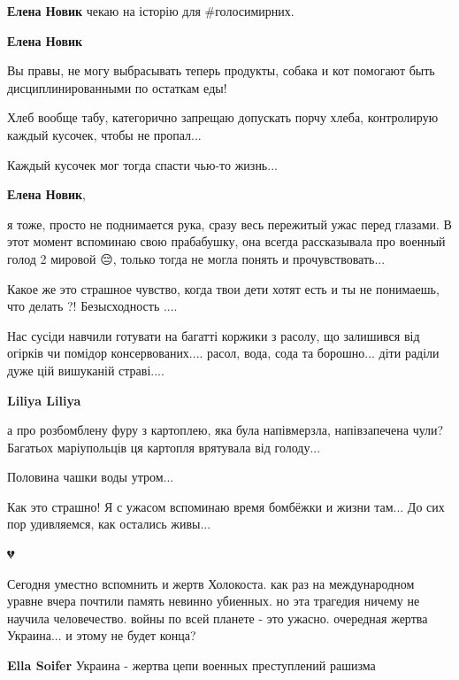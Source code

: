 \begin{itemize} %
\textbf{Елена Новик} чекаю на історію для \#голосимирних.

\textbf{Елена Новик} 

Вы правы, не могу выбрасывать теперь продукты, собака и кот помогают быть
дисциплинированными по остаткам еды!

Хлеб вообще табу, категорично запрещаю допускать порчу хлеба, контролирую каждый
кусочек, чтобы не пропал...

Каждый кусочек мог тогда спасти чью-то жизнь...

\textbf{Елена Новик}, 

я тоже, просто не поднимается рука, сразу весь пережитый ужас перед глазами. В
этот момент вспоминаю свою прабабушку, она всегда рассказывала про военный
голод 2 мировой 😔, только тогда не могла понять и прочувствовать...

Какое же это страшное чувство, когда твои дети хотят есть и ты не понимаешь,
что делать ?! Безысходность ....

\end{itemize} %


Нас сусіди навчили готувати на багатті коржики з расолу, що залишився від
огірків чи помідор консервованих.... расол, вода, сода та борошно... діти
раділи дуже цій вишуканій страві....

\textbf{Liliya Liliya} 

а про розбомблену фуру з картоплею, яка була напівмерзла, напівзапечена чули?
Багатьох маріупольців ця картопля врятувала від голоду...


Половина чашки воды утром...


Как это страшно! Я с ужасом вспоминаю время бомбёжки и жизни там... До сих пор
удивляемся, как остались живы...

💔


Сегодня уместно вспомнить и жертв Холокоста. как раз на международном уравне
вчера почтили память невинно убиенных. но эта трагедия ничему не научила
человечество. войны по всей планете - это ужасно. очередная жертва Украина... и
этому не будет конца?

\begin{itemize} %
\textbf{Ella Soifer} Украина - жертва цепи военных преступлений рашизма
\end{itemize} %

